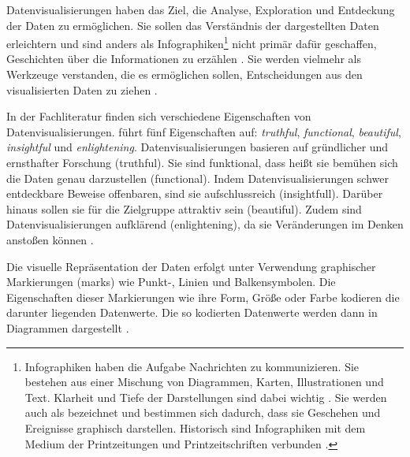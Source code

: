 Datenvisualisierungen haben das Ziel, die Analyse, Exploration und Entdeckung der Daten zu ermöglichen. Sie sollen das Verständnis der dargestellten Daten erleichtern
und sind anders als Infographiken\footnote{Infographiken haben die Aufgabe Nachrichten zu kommunizieren.
Sie bestehen aus einer Mischung von Diagrammen, Karten, Illustrationen und Text. Klarheit und Tiefe der Darstellungen sind dabei wichtig
\cite[vgl.][31]{cairo_truthful_2016}. Sie werden auch als 
bezeichnet und bestimmen sich dadurch, dass sie Geschehen und Ereignisse graphisch darstellen. 
Historisch sind Infographiken mit dem Medium der Printzeitungen und Printzeitschriften verbunden \cite[vgl.][27]{kirk_data_2019}.}
nicht primär dafür geschaffen, Geschichten über die Informationen zu erzählen \cite[vgl.][20 ff.]{kirk_data_2019}. 
Sie werden vielmehr als Werkzeuge verstanden, die es ermöglichen sollen, Entscheidungen aus den visualisierten Daten zu ziehen \cite[vgl.][31]{cairo_truthful_2016}. %

In der Fachliteratur finden sich verschiedene Eigenschaften von Datenvisualisierungen. 
führt fünf Eigenschaften auf: \textit{truthful}, \textit{functional}, \textit{beautiful}, \textit{insightful} und \textit{enlightening}.
Datenvisualisierungen basieren auf gründlicher und ernsthafter Forschung (truthful). Sie sind funktional, dass heißt
sie bemühen sich die Daten genau darzustellen (functional). Indem Datenvisualisierungen schwer entdeckbare Beweise offenbaren, 
sind sie aufschlussreich (insightfull). Darüber hinaus sollen sie für die Zielgruppe attraktiv sein (beautiful).
Zudem sind Datenvisualisierungen aufklärend (enlightening), da sie Veränderungen im Denken anstoßen können \cite[vgl.][45]{cairo_truthful_2016}. 

Die visuelle Repräsentation der Daten erfolgt unter Verwendung graphischer Markierungen (marks) wie Punkt-, 
Linien und Balkensymbolen. Die Eigenschaften dieser Markierungen wie ihre Form, Größe oder Farbe kodieren die
darunter liegenden Datenwerte. Die so kodierten Datenwerte werden dann in Diagrammen dargestellt \cite[vgl.][135 ff.]{kirk_data_2019}.

